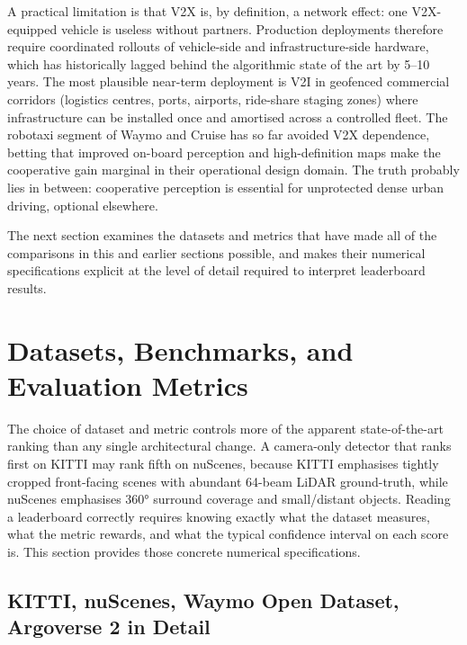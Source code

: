\documentclass{article}
\begin{document}
A practical limitation is that V2X is, by definition, a network effect: one V2X-equipped vehicle is useless without partners. Production deployments therefore require coordinated rollouts of vehicle-side and infrastructure-side hardware, which has historically lagged behind the algorithmic state of the art by 5--10 years. The most plausible near-term deployment is V2I in geofenced commercial corridors (logistics centres, ports, airports, ride-share staging zones) where infrastructure can be installed once and amortised across a controlled fleet. The robotaxi segment of Waymo and Cruise has so far avoided V2X dependence, betting that improved on-board perception and high-definition maps make the cooperative gain marginal in their operational design domain. The truth probably lies in between: cooperative perception is essential for unprotected dense urban driving, optional elsewhere.

The next section examines the datasets and metrics that have made all of the comparisons in this and earlier sections possible, and makes their numerical specifications explicit at the level of detail required to interpret leaderboard results.
\section{Datasets, Benchmarks, and Evaluation Metrics}\label{sec:datasets-benchmarks-and-evaluation-metrics}
The choice of dataset and metric controls more of the apparent state-of-the-art ranking than any single architectural change. A camera-only detector that ranks first on KITTI may rank fifth on nuScenes, because KITTI emphasises tightly cropped front-facing scenes with abundant 64-beam LiDAR ground-truth, while nuScenes emphasises 360° surround coverage and small/distant objects. Reading a leaderboard correctly requires knowing exactly what the dataset measures, what the metric rewards, and what the typical confidence interval on each score is. This section provides those concrete numerical specifications.

\subsection{KITTI, nuScenes, Waymo Open Dataset, Argoverse 2 in Detail}\label{kitti-nuscenes-waymo-open-dataset-argoverse-2-in-detail}
\end{document}
